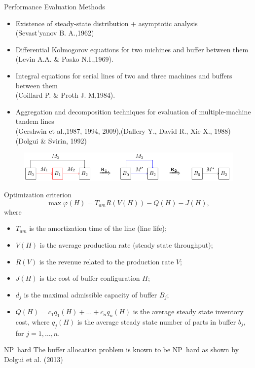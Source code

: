 \documentclass[aspectratio=169,xcolor=dvipsnames]{beamer}
\begin{document}

\begin{frame}{Performance Evaluation Methods}
    \begin{itemize}
	\item Existence of steady-state distribution + asymptotic analysis\\
	(Sevast'yanov B. A.,1962)
	\item Differential Kolmogorov equations for two michines and buffer between them \\
	(Levin A.A. \& Pasko N.I.,1969).
	\item Integral equations for serial lines of two and three machines and buffers between them\\
	(Coillard P. \& Proth J. M,1984).
	\item Aggregation and decomposition techniques for evaluation of multiple-machine tandem lines\\
	(Gershwin et al.,1987, 1994, 2009),(Dallery Y., David R., Xie X., 1988)\\
	(Dolgui \& Svirin, 1992)\\
    \end{itemize}
    \begin{figure}
    \includegraphics[scale=0.8]{alg_line}
    \end{figure}
\end{frame}


\begin{frame}{Optimization criterion}
\begin{equation}
\max \varphi(H)=T_{am} R(V(H)) - Q(H) - J(H),
\end{equation}
where 
\begin{itemize}
\item $T_{am}$  is the amortization time of the line (line life); 
\item $V(H)$ is the average production rate (steady state throughput); 
\item $R(V)$  is the revenue related to the production rate $V$; 
\item $J(H)$ is the cost of buffer configuration $H$; 
\item $d_j$ is the maximal admissible capacity of buffer $B_j$;
\item $Q(H)= c_1q_1(H)+ …+c_n q_n(H)$ is the average steady state inventory cost, where $q_j(H)$ is the average steady state number of parts in buffer $b_j$, for $j=1,…,n$.
\end{itemize}
    \begin{block}{NP~hard}
       The buffer allocation problem is known to be NP~hard as shown by Dolgui et al. (2013)
    \end{block}
\end{frame}
\end{document}
